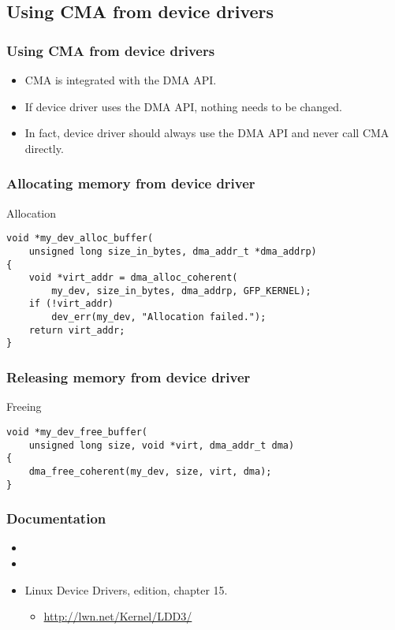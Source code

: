 
\subsection{Using CMA from device drivers}

\begin{frame}
  \frametitle{Using CMA from device drivers}

  \begin{itemize}
  \item CMA is integrated with the DMA API.
  \item If device driver uses the DMA API, nothing needs to be changed.
  \item In fact, device driver should always use the DMA API and never
    call CMA directly.
  \end{itemize}
\end{frame}

\begin{frame}[fragile]
  \frametitle{Allocating memory from device driver}

  \begin{block}{Allocation}
\begin{lstlisting}
void *my_dev_alloc_buffer(
    unsigned long size_in_bytes, dma_addr_t *dma_addrp)
{
    void *virt_addr = dma_alloc_coherent(
        my_dev, size_in_bytes, dma_addrp, GFP_KERNEL);
    if (!virt_addr)
        dev_err(my_dev, "Allocation failed.");
    return virt_addr;
}
\end{lstlisting}
  \end{block}

\end{frame}

\begin{frame}[fragile]
  \frametitle{Releasing memory from device driver}

  \begin{block}{Freeing}
\begin{lstlisting}
void *my_dev_free_buffer(
    unsigned long size, void *virt, dma_addr_t dma)
{
    dma_free_coherent(my_dev, size, virt, dma);
}
\end{lstlisting}
  \end{block}
\end{frame}

\begin{frame}
  \frametitle{Documentation}

  \begin{itemize}
  \item {}
  \item {}
  \item Linux Device Drivers,  edition, chapter 15.
    \begin{itemize}
    \item \url{http://lwn.net/Kernel/LDD3/}
    \end{itemize}
  \end{itemize}
\end{frame}
